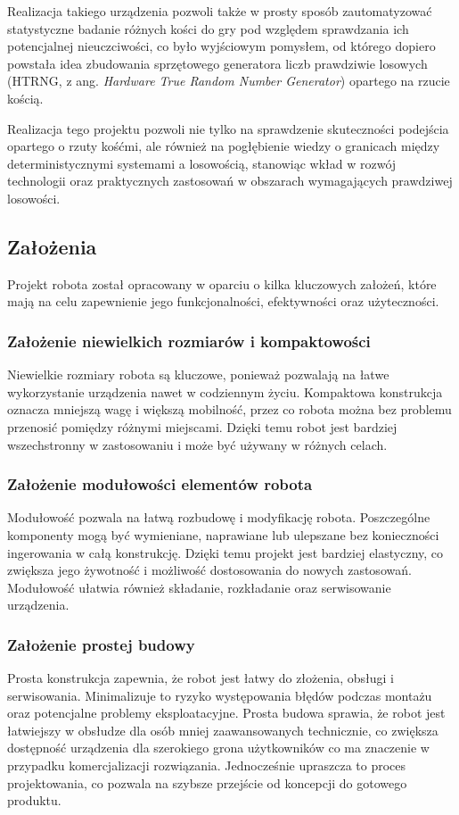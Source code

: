 Realizacja takiego urządzenia pozwoli także w prosty sposób zautomatyzować statystyczne badanie różnych
kości do gry pod względem sprawdzania ich potencjalnej nieuczciwości,
co było wyjściowym pomysłem, od którego dopiero powstała idea zbudowania sprzętowego generatora liczb prawdziwie losowych
(HTRNG, z ang. \textit{Hardware True Random Number Generator}) opartego na rzucie kością.

Realizacja tego projektu pozwoli nie tylko na sprawdzenie skuteczności podejścia opartego o rzuty kośćmi,
ale również na pogłębienie wiedzy o granicach między deterministycznymi systemami a losowością,
stanowiąc wkład w rozwój technologii oraz praktycznych zastosowań w obszarach wymagających prawdziwej losowości.

\subsection{Założenia}

Projekt robota został opracowany w oparciu o kilka kluczowych założeń, które mają na celu zapewnienie jego funkcjonalności, efektywności oraz użyteczności. 

\subsubsection{Założenie niewielkich rozmiarów i kompaktowości}
Niewielkie rozmiary robota są kluczowe, ponieważ pozwalają na łatwe wykorzystanie urządzenia nawet w codziennym życiu. Kompaktowa konstrukcja oznacza 
mniejszą wagę i większą mobilność, przez co robota można bez problemu przenosić pomiędzy różnymi miejscami. Dzięki temu robot jest bardziej wszechstronny 
w zastosowaniu i może być używany w różnych celach.

\subsubsection{Założenie modułowości elementów robota}
Modułowość pozwala na łatwą rozbudowę i modyfikację robota. Poszczególne komponenty mogą być wymieniane, naprawiane lub ulepszane bez konieczności 
ingerowania w całą konstrukcję. Dzięki temu projekt jest bardziej elastyczny, co zwiększa jego żywotność i możliwość dostosowania do nowych zastosowań. 
Modułowość ułatwia również składanie, rozkładanie oraz serwisowanie urządzenia.

\subsubsection{Założenie prostej budowy}
Prosta konstrukcja zapewnia, że robot jest łatwy do złożenia, obsługi i serwisowania. Minimalizuje to ryzyko występowania błędów podczas montażu oraz 
potencjalne problemy eksploatacyjne. Prosta budowa sprawia, że robot jest łatwiejszy w obsłudze dla osób mniej zaawansowanych technicznie, co zwiększa dostępność 
urządzenia dla szerokiego grona użytkowników co ma znaczenie w przypadku komercjalizacji rozwiązania. Jednocześnie upraszcza to proces projektowania, co pozwala 
na szybsze przejście od koncepcji do gotowego produktu.

